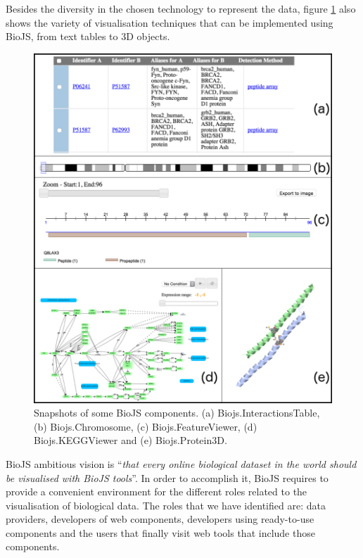 Besides the diversity in the chosen technology to represent the data, figure \ref{fig:biojs_components} also shows the variety of visualisation techniques that can be implemented using BioJS, from text tables to 3D objects.

\begin{figure}  
\centering
\includegraphics[width=\textwidth]{figures/biojs_components.png}
\caption[Snapshots of some BioJS components.]{Snapshots of some BioJS components. (a) Biojs.InteractionsTable, (b) Biojs.Chromosome, (c) Biojs.FeatureViewer, (d) Biojs.KEGGViewer and  (e) Biojs.Protein3D.
\label{fig:biojs_components}}
\end{figure}
 


BioJS ambitious vision is ``\emph{that every online biological dataset in the world should be visualised with BioJS tools}''. In order to accomplish it, BioJS requires to provide a convenient environment for the different roles related to the visualisation of biological data. The roles that we have identified are: data providers,  developers of web components, developers using ready-to-use components and the users that finally visit web tools that include those components.

